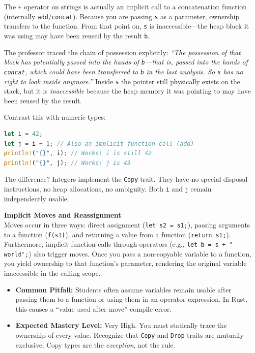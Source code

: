 The \texttt{+} operator on strings is actually an implicit call to a concatenation function (internally \texttt{add}/\texttt{concat}). Because you are passing \texttt{s} as a parameter, ownership transfers to the function. From that point on, \texttt{s} is inaccessible---the heap block it was using may have been reused by the result \texttt{b}.

The professor traced the chain of possession explicitly: \emph{``The possession of that block has potentially passed into the hands of \texttt{b}---that is, passed into the hands of \texttt{concat}, which could have been transferred to \texttt{b} in the last analysis. So \texttt{s} has no right to look inside anymore.''} Inside \texttt{s} the pointer still physically exists on the stack, but it is \emph{inaccessible} because the heap memory it was pointing to may have been reused by the result.

Contrast this with numeric types:

\begin{lstlisting}[language=Rust]
let i = 42;
let j = i + 1; // Also an implicit function call (add)
println!("{}", i); // Works! i is still 42
println!("{}", j); // Works! j is 43
\end{lstlisting}

The difference? Integers implement the \texttt{Copy} trait. They have no special disposal instructions, no heap allocations, no ambiguity. Both \texttt{i} and \texttt{j} remain independently usable.

\begin{examprioritybox}
\textbf{Implicit Moves and Reassignment} \\
Moves occur in three ways: direct assignment (\texttt{let s2 = s1;}), passing arguments to a function (\texttt{f(s1)}), and returning a value from a function (\texttt{return s1;}). Furthermore, implicit function calls through operators (e.g., \texttt{let b = s + " world";}) also trigger moves. Once you pass a non-copyable variable to a function, you yield ownership to that function's parameter, rendering the original variable inaccessible in the calling scope.
\begin{itemize}
    \item \textbf{Common Pitfall:} Students often assume variables remain usable after passing them to a function or using them in an operator expression. In Rust, this causes a ``value used after move'' compile error.
    \item \textbf{Expected Mastery Level:} Very High. You must statically trace the ownership of every value. Recognize that \texttt{Copy} and \texttt{Drop} traits are mutually exclusive. Copy types are the \emph{exception}, not the rule.
\end{itemize}
\end{examprioritybox}

